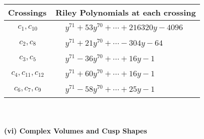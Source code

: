 \documentclass[1p]{elsarticle_modified}
\theoremstyle{definition}
\begin{document}
\begin{tabular}{m{50pt}|m{274pt}}
Crossings & \hspace{64pt}Riley Polynomials at each crossing \\
\hline $$\begin{aligned}c_{1},c_{10}\end{aligned}$$&$\begin{aligned}
&y^{71}+53 y^{70}+\cdots+216320 y-4096
\end{aligned}$\\
\hline $$\begin{aligned}c_{2},c_{8}\end{aligned}$$&$\begin{aligned}
&y^{71}+21 y^{70}+\cdots-304 y-64
\end{aligned}$\\
\hline $$\begin{aligned}c_{3},c_{5}\end{aligned}$$&$\begin{aligned}
&y^{71}-36 y^{70}+\cdots+16 y-1
\end{aligned}$\\
\hline $$\begin{aligned}c_{4},c_{11},c_{12}\end{aligned}$$&$\begin{aligned}
&y^{71}+60 y^{70}+\cdots+16 y-1
\end{aligned}$\\
\hline $$\begin{aligned}c_{6},c_{7},c_{9}\end{aligned}$$&$\begin{aligned}
&y^{71}-58 y^{70}+\cdots+25 y-1
\end{aligned}$\\
\hline
\end{tabular}\\~\\
\newpage\flushleft \textbf{(vi) Complex Volumes and Cusp Shapes}
\end{document}

